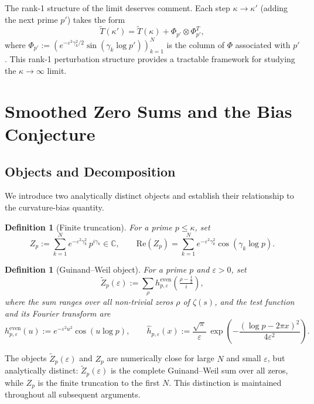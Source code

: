 \documentclass[11pt]{article}
\newtheorem{definition}[theorem]{Definition}
\newcommand{\Tt}{\widetilde{T}}
\newcommand{\Zt}{\widetilde{Z}}
\begin{document}
The rank-1 structure of the limit deserves comment.
Each step $\kappa\to\kappa'$ (adding the next prime $p'$) takes the form
\[
\Tt(\kappa') = \Tt(\kappa) + \Phi_{p'}\otimes\Phi_{p'}^T,
\]
where $\Phi_{p'} := (e^{-\varepsilon^2\gamma_k^2/2}\sin(\gamma_k\log p'))_{k=1}^N$
is the column of $\Phi$ associated with $p'$.
This rank-1 perturbation structure provides a tractable framework for
studying the $\kappa\to\infty$ limit.

\section{Smoothed Zero Sums and the Bias Conjecture}
\label{sec:smoothed}

\subsection{Objects and Decomposition}
\label{ssec:objects}

We introduce two analytically distinct objects and establish their
relationship to the curvature-bias quantity.

\begin{definition}[Finite truncation]
\label{def:Zp}
For a prime $p\leq\kappa$, set
\[
Z_p := \sum_{k=1}^N e^{-\varepsilon^2\gamma_k^2}\,p^{i\gamma_k}\in\mathbb{C},
\qquad
\mathrm{Re}(Z_p) = \sum_{k=1}^N e^{-\varepsilon^2\gamma_k^2}\cos(\gamma_k\log p).
\]
\end{definition}

\begin{definition}[Guinand--Weil object]
\label{def:Ztilde}
For a prime $p$ and $\varepsilon>0$, set
\[
\Zt_p(\varepsilon) := \sum_\rho h^{\mathrm{even}}_{p,\varepsilon}\!\left(\tfrac{\rho-\frac12}{i}\right),
\]
where the sum ranges over all non-trivial zeros $\rho$ of $\zeta(s)$,
and the test function and its Fourier transform are
\[
h^{\mathrm{even}}_{p,\varepsilon}(u) := e^{-\varepsilon^2 u^2}\cos(u\log p),
\qquad
\hat{h}_{p,\varepsilon}(x) := \frac{\sqrt{\pi}}{\varepsilon}\,
  \exp\!\left(-\frac{(\log p - 2\pi x)^2}{4\varepsilon^2}\right).
\]
\end{definition}

The objects $\Zt_p(\varepsilon)$ and $Z_p$ are numerically close for
large $N$ and small $\varepsilon$, but analytically distinct:
$\Zt_p(\varepsilon)$ is the complete Guinand--Weil sum over all zeros,
while $Z_p$ is the finite truncation to the first $N$.
This distinction is maintained throughout all subsequent arguments.
\end{document}
